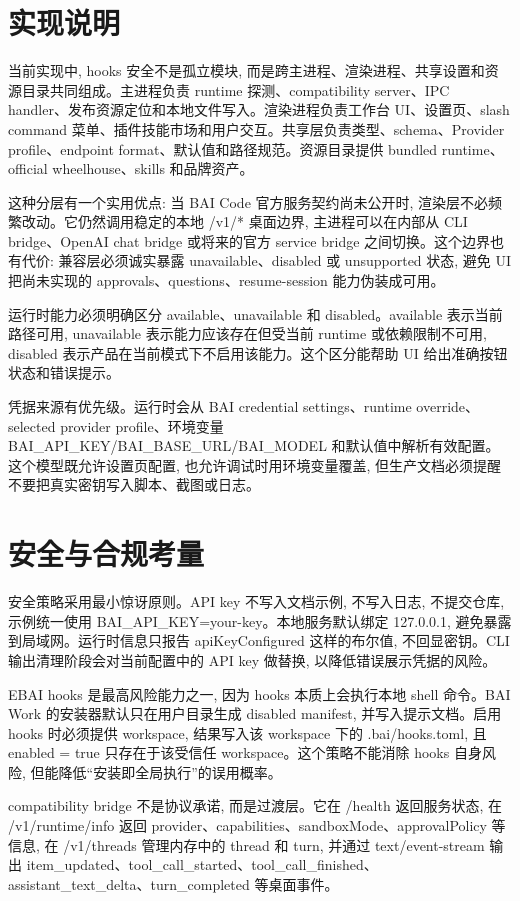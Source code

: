 \section{实现说明}
当前实现中, hooks 安全不是孤立模块, 而是跨主进程、渲染进程、共享设置和资源目录共同组成。主进程负责 runtime 探测、compatibility server、IPC handler、发布资源定位和本地文件写入。渲染进程负责工作台 UI、设置页、slash command 菜单、插件技能市场和用户交互。共享层负责类型、schema、Provider profile、endpoint format、默认值和路径规范。资源目录提供 bundled runtime、official wheelhouse、skills 和品牌资产。

这种分层有一个实用优点: 当 BAI Code 官方服务契约尚未公开时, 渲染层不必频繁改动。它仍然调用稳定的本地 /v1/* 桌面边界, 主进程可以在内部从 CLI bridge、OpenAI chat bridge 或将来的官方 service bridge 之间切换。这个边界也有代价: 兼容层必须诚实暴露 unavailable、disabled 或 unsupported 状态, 避免 UI 把尚未实现的 approvals、questions、resume-session 能力伪装成可用。

运行时能力必须明确区分 available、unavailable 和 disabled。available 表示当前路径可用, unavailable 表示能力应该存在但受当前 runtime 或依赖限制不可用, disabled 表示产品在当前模式下不启用该能力。这个区分能帮助 UI 给出准确按钮状态和错误提示。

凭据来源有优先级。运行时会从 BAI credential settings、runtime override、selected provider profile、环境变量 BAI\_API\_KEY/BAI\_BASE\_URL/BAI\_MODEL 和默认值中解析有效配置。这个模型既允许设置页配置, 也允许调试时用环境变量覆盖, 但生产文档必须提醒不要把真实密钥写入脚本、截图或日志。

\section{安全与合规考量}
安全策略采用最小惊讶原则。API key 不写入文档示例, 不写入日志, 不提交仓库, 示例统一使用 BAI\_API\_KEY=your-key。本地服务默认绑定 127.0.0.1, 避免暴露到局域网。运行时信息只报告 apiKeyConfigured 这样的布尔值, 不回显密钥。CLI 输出清理阶段会对当前配置中的 API key 做替换, 以降低错误展示凭据的风险。

EBAI hooks 是最高风险能力之一, 因为 hooks 本质上会执行本地 shell 命令。BAI Work 的安装器默认只在用户目录生成 disabled manifest, 并写入提示文档。启用 hooks 时必须提供 workspace, 结果写入该 workspace 下的 .bai/hooks.toml, 且 enabled = true 只存在于该受信任 workspace。这个策略不能消除 hooks 自身风险, 但能降低“安装即全局执行”的误用概率。

compatibility bridge 不是协议承诺, 而是过渡层。它在 /health 返回服务状态, 在 /v1/runtime/info 返回 provider、capabilities、sandboxMode、approvalPolicy 等信息, 在 /v1/threads 管理内存中的 thread 和 turn, 并通过 text/event-stream 输出 item\_updated、tool\_call\_started、tool\_call\_finished、assistant\_text\_delta、turn\_completed 等桌面事件。

